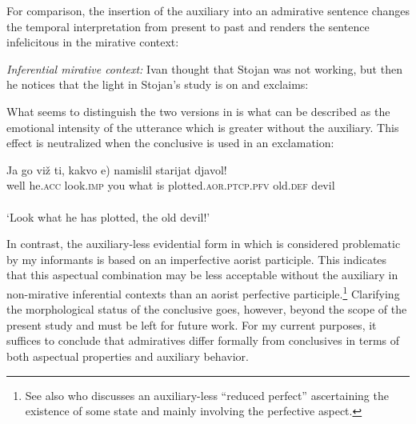 \documentclass[output=paper,
colorlinks,
citecolor=brown,
newtxmath
]{langscibook}
\begin{document}
\noindent For comparison, the insertion of the auxiliary into an admirative sentence changes the temporal interpretation from present to past and renders the sentence infelicitous in the mirative context:

    \largerpage[2]

\eanoraggedright
\textit{Inferential mirative context:} Ivan thought that Stojan was not working, but then he notices that the light in Stojan's study is on and exclaims:\vspace{-6pt}
\z
\begin{exe}
\end{exe}

\noindent What seems to distinguish the two versions in  is what can be described as the emotional intensity of the utterance which is greater without the auxiliary. This effect is neutralized when the conclusive is used in an exclamation:

\ea \label{djavol}
\gll Ja go viž ti, kakvo \minsp{(} e) namislil starijat djavol!\\
well he.\textsc{acc} look.\textsc{imp} you what {} is plotted.\textsc{aor.ptcp.pfv} old.\textsc{def} devil\\ \hfill \citep[150]{Levin-Steinmann2004} \\
\glt `Look what he has plotted, the old devil!'
\z



\noindent In contrast, the auxiliary-less evidential form in  which is considered problematic by my informants is based on an imperfective aorist participle. This indicates that this aspectual combination may be less acceptable without the auxiliary in non-mirative inferential contexts than an aorist perfective participle.\footnote{See also \citet[33]{Levin-Steinmann2004} who discusses an auxiliary-less ``reduced perfect'' ascertaining the existence of some state and mainly involving the perfective aspect.} Clarifying the morphological status of the conclusive goes, however, beyond the scope of the present study and must be left for future work. For my current purposes, it suffices to conclude that admiratives differ formally from conclusives in terms of both aspectual properties and auxiliary behavior.
\end{document}
